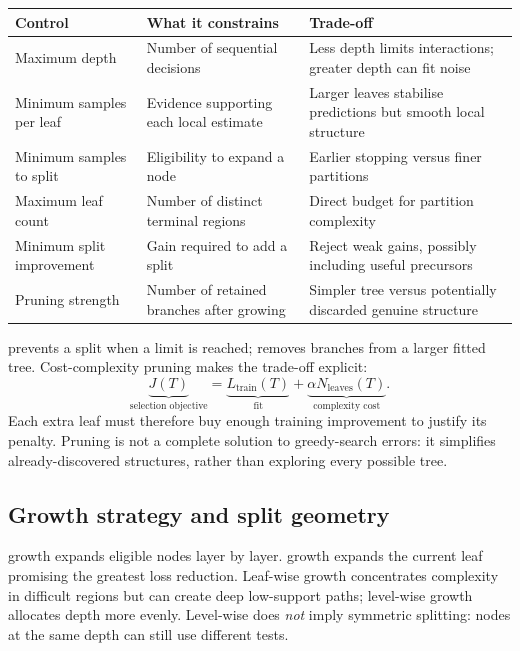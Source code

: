 \begin{center}\small
\begin{tabularx}{\linewidth}{@{}L{.24\linewidth}YY@{}}\toprule
Control & What it constrains & Trade-off\\\midrule
Maximum depth & Number of sequential decisions & Less depth limits interactions; greater depth can fit noise\\
Minimum samples per leaf & Evidence supporting each local estimate & Larger leaves stabilise predictions but smooth local structure\\
Minimum samples to split & Eligibility to expand a node & Earlier stopping versus finer partitions\\
Maximum leaf count & Number of distinct terminal regions & Direct budget for partition complexity\\
Minimum split improvement & Gain required to add a split & Reject weak gains, possibly including useful precursors\\
Pruning strength & Number of retained branches after growing & Simpler tree versus potentially discarded genuine structure\\\bottomrule
\end{tabularx}
\end{center}

 prevents a split when a limit is reached;  removes branches from a larger fitted tree.
Cost-complexity pruning makes the trade-off explicit:
\begin{equation}
\underbrace{J(T)}_{\text{selection objective}}
=
\underbrace{L_{\mathrm{train}}(T)}_{\text{fit}}
+
\underbrace{\alpha N_{\text{leaves}}(T)}_{\text{complexity cost}}.
\end{equation}
Each extra leaf must therefore buy enough training improvement to justify its penalty.
Pruning is not a complete solution to greedy-search errors: it simplifies already-discovered structures, rather than exploring every possible tree.

\subsection{Growth strategy and split geometry}
\label{subsec:trees-growth-strategy-and-split-geometry}
 growth expands eligible nodes layer by layer.
 growth expands the current leaf promising the greatest loss reduction.
Leaf-wise growth concentrates complexity in difficult regions but can create deep low-support paths; level-wise growth allocates depth more evenly.
Level-wise does \emph{not} imply symmetric splitting: nodes at the same depth can still use different tests.

